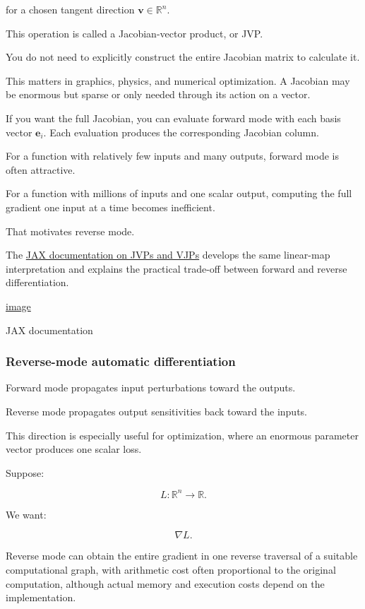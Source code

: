 for a chosen tangent direction \(\mathbf v\in\mathbb R^n\).

This operation is called a Jacobian-vector product, or JVP.

You do not need to explicitly construct the entire Jacobian matrix to calculate it.

This matters in graphics, physics, and numerical optimization. A Jacobian may be enormous but sparse or only needed through its action on a vector.

If you want the full Jacobian, you can evaluate forward mode with each basis vector \(\mathbf e_i\). Each evaluation produces the corresponding Jacobian column.

For a function with relatively few inputs and many outputs, forward mode is often attractive.

For a function with millions of inputs and one scalar output, computing the full gradient one input at a time becomes inefficient.

That motivates reverse mode.

The \href{https://docs.jax.dev/en/latest/jacobian-vector-products.html?utm_source=chatgpt.com}{JAX documentation on JVPs and VJPs} develops the same linear-map interpretation and explains the practical trade-off between forward and reverse differentiation. 

\href{https://www.google.com/s2/favicons?domain=https://docs.jax.dev&sz=32}{image}

JAX documentation

\subsubsection{Reverse-mode automatic differentiation}\label{reverse-mode-automatic-differentiation}

Forward mode propagates input perturbations toward the outputs.

Reverse mode propagates output sensitivities back toward the inputs.

This direction is especially useful for optimization, where an enormous parameter vector produces one scalar loss.

Suppose:

\[
L:\mathbb R^n\rightarrow\mathbb R.
\]

We want:

\[
\nabla L.
\]

Reverse mode can obtain the entire gradient in one reverse traversal of a suitable computational graph, with arithmetic cost often proportional to the original computation, although actual memory and execution costs depend on the implementation.

